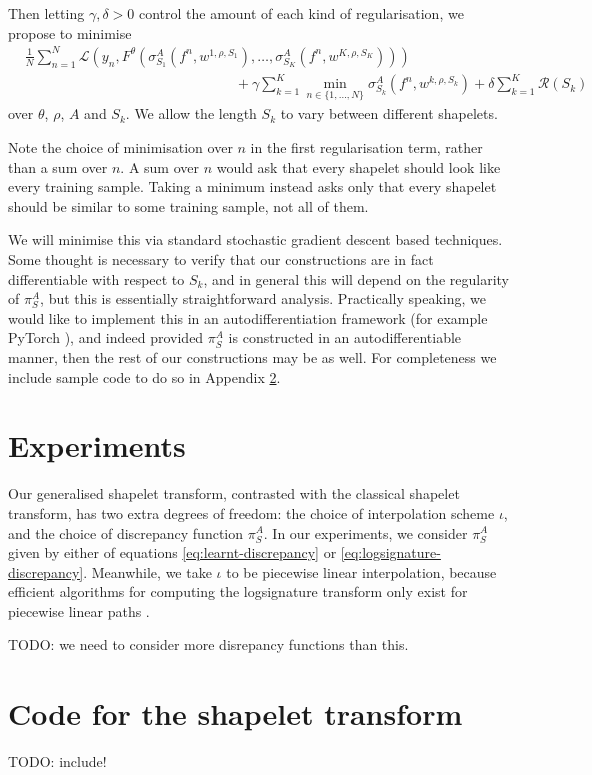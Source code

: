 \documentclass{article}
\theoremstyle{plain}
\theoremstyle{definition}
\begin{document}
	Then letting $\gamma, \delta > 0$ control the amount of each kind of regularisation, we propose to minimise
	\newcommand{\objective}{&\frac{1}{N}\sum_{n = 1}^N \mathcal{L}(y_n, F^\theta(\sigma^A_{S_1}(f^n, w^{1, \rho, S_1}), \ldots, \sigma^A_{S_K}(f^n, w^{K, \rho, S_K})))\nonumber\\[-10pt]
	&\hspace{15em} + \gamma \sum_{k = 1}^K \min_{n \in \{1, \ldots, N\}} \sigma^A_{S_k}(f^n, w^{k, \rho, S_k}) + \delta \sum_{k = 1}^K\mathcal{R}(S_k)}
	\begin{align}
	\objective \label{eq:objective}
	\end{align}
	over $\theta$, $\rho$, $A$ and $S_k$. We allow the length $S_k$ to vary between different shapelets.
	
	Note the choice of minimisation over $n$ in the first regularisation term, rather than a sum over $n$. A sum over $n$ would ask that every shapelet should look like every training sample. Taking a minimum instead asks only that every shapelet should be similar to some training sample, not all of them.
	
	We will minimise this via standard stochastic gradient descent based techniques. Some thought is necessary to verify that our constructions are in fact differentiable with respect to $S_k$, and in general this will depend on the regularity of $\pi^A_S$, but this is essentially straightforward analysis. Practically speaking, we would like to implement this in an autodifferentiation framework (for example PyTorch \cite{pytorch}), and indeed provided $\pi^A_S$ is constructed in an autodifferentiable manner, then the rest of our constructions may be as well. For completeness we include sample code to do so in Appendix \ref{appendix:code}.
	
	\section{Experiments}
	Our generalised shapelet transform, contrasted with the classical shapelet transform, has two extra degrees of freedom: the choice of interpolation scheme $\iota$, and the choice of discrepancy function $\pi^A_S$. In our experiments, we consider $\pi^A_S$ given by either of equations \eqref{eq:learnt-discrepancy} or \eqref{eq:logsignature-discrepancy}. Meanwhile, we take $\iota$ to be piecewise linear interpolation, because efficient algorithms for computing the logsignature transform only exist for piecewise linear paths \cite{signatory}.
	
	TODO: we need to consider more disrepancy functions than this.
	
	\appendix
	\section{Code for the shapelet transform}\label{appendix:code}
	TODO: include!
	
\end{document}
